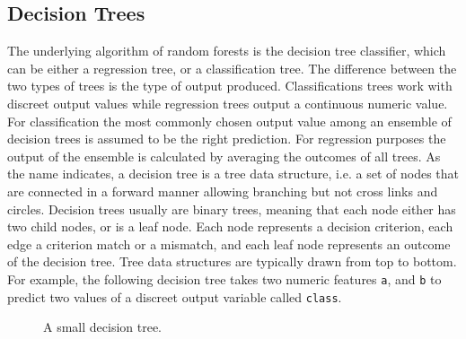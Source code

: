 \documentclass[a4paper,man,12pt,apacite,floatsintext]{apa6} %
\begin{document}
\subsection{Decision Trees}

The underlying algorithm of random forests is the decision tree classifier,
which can be either a regression tree, or a classification tree.
The difference between the two types of trees is the type of output produced.
Classifications trees work with discreet output values
while regression trees output a continuous numeric value.
For classification the most commonly chosen output value among an ensemble
of decision trees is assumed to be the right prediction.
For regression purposes the output of the ensemble is calculated by averaging
the outcomes of all trees.
As the name indicates, a decision tree is a tree data structure, i.e.
a set of nodes that are connected in a forward manner allowing branching
but not cross links and circles.
Decision trees usually are binary trees, meaning that each node either has
two child nodes, or is a leaf node.
Each node represents a decision criterion, each edge a criterion match or
a mismatch, and each leaf node represents an outcome of the decision tree.
Tree data structures are typically drawn from top to bottom.
For example, the following decision tree takes two numeric features
\texttt{a}, and \texttt{b} to predict two values of a discreet output variable
called \texttt{class}.

\begin{figure}
\caption{A small decision tree.}
\begin{center}
\end{center}
\end{figure}
\end{document}
